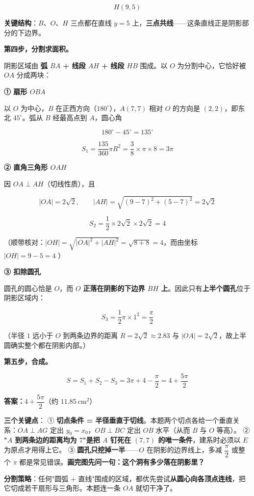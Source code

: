 \[H(9,5)\]

\textbf{关键结构}：$B$、$O$、$H$ 三点都在直线 $y=5$ 上，\textbf{三点共线}——这条直线正是阴影部分的下边界。

\textbf{第四步，分割求面积。}

阴影区域由 \textbf{弧 $BA$ + 线段 $AH$ + 线段 $HB$} 围成。以 $O$ 为分割中心，它恰好被 $OA$ 分成两块：

\textbf{① 扇形 $OBA$}

以 $O$ 为中心，$B$ 在正西方向（$180^\circ$），$A(7,7)$ 相对 $O$ 的方向是 $(2,2)$，即东北 $45^\circ$。弧从 $B$ 经最高点到 $A$，圆心角

\[180^\circ-45^\circ=135^\circ\]

\[S_1=\frac{135}{360}\pi R^{2}=\frac38\times\pi\times8=3\pi\]

\textbf{② 直角三角形 $OAH$}

因 $OA\perp AH$（切线性质），且

\[|OA|=2\sqrt2,\qquad |AH|=\sqrt{(9-7)^{2}+(5-7)^{2}}=2\sqrt2\]

\[S_2=\frac12\times2\sqrt2\times2\sqrt2=4\]

（顺带核对：$|OH|=\sqrt{|OA|^{2}+|AH|^{2}}=\sqrt{8+8}=4$，而由坐标 $|OH|=9-5=4$ ）

\textbf{③ 扣除圆孔}

圆孔的圆心恰是 $O$，而 $O$ \textbf{正落在阴影的下边界 $BH$ 上}。因此只有\textbf{上半个圆孔}位于阴影区域内：

\[S_3=\frac12\pi\times1^{2}=\frac\pi2\]

（半径 $1$ 远小于 $O$ 到两条边界的距离 $R=2\sqrt2\approx2.83$ 与 $|OA|=2\sqrt2$，故上半圆确实整个都在阴影内部。）

\textbf{第五步，合成。}

\[S=S_1+S_2-S_3=3\pi+4-\frac\pi2=4+\frac{5\pi}2\]

\textbf{答案：$4+\dfrac{5\pi}2$}（约 $11.85\ \mathrm{cm}^{2}$）

\begin{gktip}
\textbf{三个关键点}：
① \textbf{切点条件 = 半径垂直于切线}。本题两个切点各给一个垂直关系：$OA\perp AG$ 定出 $y_0=x_0$，$OB\perp BC$ 定出 $OB$ 水平（从而 $B$ 与 $O$ 等高）。
② \textbf{"$A$ 到两条边的距离均为 $7$"是把 $A$ 钉死在 $(7,7)$ 的唯一条件}，建系时必须以 $E$ 为原点才用得上它。
③ \textbf{圆孔只挖掉一半}——$O$ 在阴影的边界线上，多减 $\dfrac\pi2$ 或整个 $\pi$ 都是常见错误。\textbf{画完图先问一句：这个洞有多少落在阴影里？}

\textbf{分割策略}：任何"圆弧 + 直线"围成的区域，都优先尝试\textbf{从圆心向各顶点连线}，把它切成若干扇形与三角形。本题连一条 $OA$ 就切干净了。
\end{gktip}

